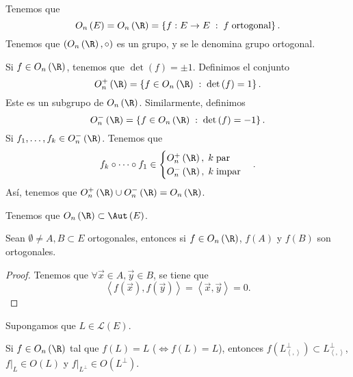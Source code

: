 \begin{observation}
\normalfont Tenemos que
\[ O_{n}\left(E\right) = O_{n}\left(\R\right) = \left\{ f : E \to E \; : \; f \; \text{ortogonal}\right\}  .\]
Tenemos que $\displaystyle \left(O_{n}\left(\R\right), \circ \right) $ es un grupo, y se le denomina grupo ortogonal.
\end{observation}
Si $\displaystyle f \in O_{n}\left(\R\right) $, tenemos que $\displaystyle \det\left(f\right) = \pm 1 $. Definimos el conjunto
\[ O^{+}_{n}\left(\R\right) = \left\{ f \in O_{n}\left(\R\right) \; : \; \det\left(f\right) = 1\right\}  .\]
Este es un subgrupo de $\displaystyle O_{n}\left(\R\right) $. Similarmente, definimos
\[ O^{-}_{n}\left(\R\right) = \left\{ f \in O_{n}\left(\R\right) \; : \; \det\left(f\right) = -1\right\}  .\]
Si $\displaystyle f_{1}, \ldots, f_{k} \in O^{-}_{n}\left(\R\right) $. Tenemos que 
\[ f_{k}\circ \cdots \circ f_{1} \in 
\begin{cases}
O^{+}_{n}\left(\R\right),\; k \; \text{par} \\
O^{-}_{n}\left(\R\right), \; k \; \text{impar}
\end{cases}
.\]
Así, tenemos que $\displaystyle O^{+}_{n}\left(\R\right) \cup O^{-}_{n}\left(\R\right) = O_{n}\left(\R\right) $.
\begin{observation}
\normalfont Tenemos que $\displaystyle O_{n}\left(\R\right) \subset \Aut\left(E\right) $. 
\end{observation}
\begin{fprop}[]
\normalfont Sean $\displaystyle \emptyset\neq A,B \subset E $ ortogonales, entonces si $\displaystyle f \in O_{n}\left(\R\right) $, $\displaystyle f\left(A\right) $ y $\displaystyle f\left(B\right) $ son ortogonales.
\end{fprop}
\begin{proof}
Tenemos que $\displaystyle \forall \vec{x} \in A, \vec{y} \in B $, se tiene que 
\[\left\langle f\left(\vec{x}\right), f\left(\vec{y}\right) \right\rangle = \left\langle \vec{x}, \vec{y} \right\rangle = 0.\]
\end{proof}
Supongamos que $\displaystyle L \in \mathcal{L}\left(E\right) $. 
\begin{fprop}[]
\normalfont Si $\displaystyle f \in O_{n}\left(\R\right) $ tal que $\displaystyle f\left(L\right) = L $ ($\displaystyle \iff f\left(L\right) = L $), entonces $\displaystyle f\left(L^{\perp}_{\left\langle ,  \right\rangle }\right) \subset L^{\perp }_{\left\langle ,  \right\rangle } $, $\displaystyle f|_{L} \in O\left(L\right) $ y $\displaystyle f|_{L^{\perp }} \in O\left(L^{\perp}\right)$.
\end{fprop}
